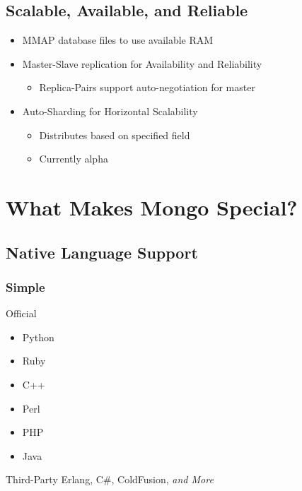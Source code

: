 \documentclass{beamer}
\begin{document}
\subsection{Scalable, Available,  and Reliable}
\begin{frame}
  \begin{itemize}
  \item MMAP database files to use available RAM
  \item Master-Slave replication for Availability and Reliability
    \begin{itemize}
      \item Replica-Pairs support auto-negotiation for master
    \end{itemize}
  \item Auto-Sharding for Horizontal Scalability
    \begin{itemize}
      \item Distributes based on specified field
      \item Currently alpha
    \end{itemize}
  \end{itemize}
\end{frame}

\section{What Makes Mongo Special?}

\subsection{Native Language Support}

\begin{frame}[fragile]
  \frametitle{Simple}

  \begin{block}{Official}
    \begin{itemize}
      \item Python
      \item Ruby
      \item C++
      \item Perl
      \item PHP
      \item Java
    \end{itemize}
  \end{block}

  \begin{block}{Third-Party}
    Erlang,
    C\#,
    ColdFusion,
    {\it and More}
  \end{block}
  
\end{frame}
\end{document}
